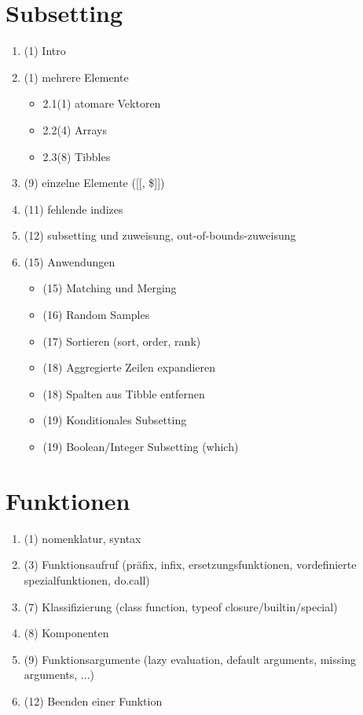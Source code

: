 \documentclass{article}
\begin{document}
\section{Subsetting}
\begin{enumerate}
    \item (1) Intro
    \item (1) mehrere Elemente
    \begin{itemize}
    \item 2.1(1) atomare Vektoren
    \item 2.2(4) Arrays	
    \item 2.3(8) Tibbles
    \end{itemize}
    \item (9) einzelne Elemente ([[, \$]])
    \item (11) fehlende indizes
    \item (12) subsetting und zuweisung, out-of-bounds-zuweisung 
    \item (15) Anwendungen
    \begin{itemize}
        \item (15) Matching und Merging
        \item (16) Random Samples
        \item (17) Sortieren (sort, order, rank)
        \item (18) Aggregierte Zeilen expandieren
        \item (18) Spalten aus Tibble entfernen
        \item (19) Konditionales Subsetting
        \item (19) Boolean/Integer Subsetting (which)
    \end{itemize}
\end{enumerate}

\section{Funktionen}
\begin{enumerate}
\item (1) nomenklatur, syntax
\item (3) Funktionsaufruf (präfix, infix, ersetzungsfunktionen, vordefinierte spezialfunktionen, do.call)
\item (7) Klassifizierung (class function, typeof closure/builtin/special)
\item (8) Komponenten
\item (9) Funktionsargumente (lazy evaluation, default arguments, missing arguments, ...)
\item (12) Beenden einer Funktion
\end{enumerate}
\end{document}
